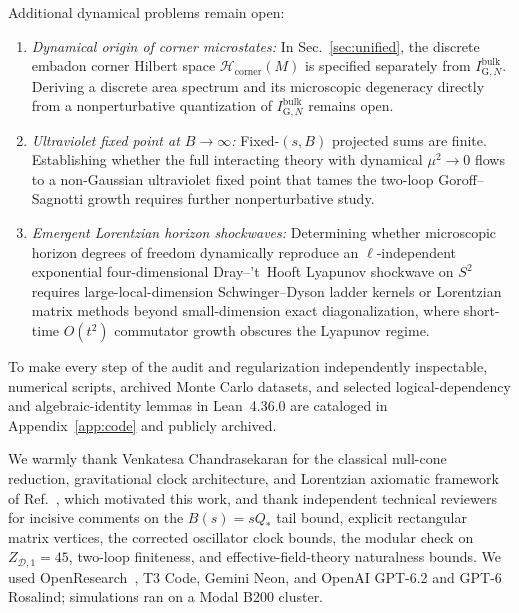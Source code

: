 \documentclass[onecolumn,11pt,aps,prd,amsmath,amssymb,nofootinbib,floatfix]{revtex4-2}
\newcommand{\scrD}{\mathscr{D}}
\newcommand{\calH}{\mathcal{H}}
\begin{document}
Additional dynamical problems remain open:
\begin{enumerate}
\item \emph{Dynamical origin of corner microstates:} In Sec.~\ref{sec:unified}, the discrete embadon corner Hilbert space $\calH_{\mathrm{corner}}(M)$ is specified separately from $I_{\mathrm{G},N}^{\mathrm{bulk}}$. Deriving a discrete area spectrum and its microscopic degeneracy directly from a nonperturbative quantization of $I_{\mathrm{G},N}^{\mathrm{bulk}}$ remains open.
\item \emph{Ultraviolet fixed point at $B\to\infty$:} Fixed-$(s,B)$ projected sums are finite. Establishing whether the full interacting theory with dynamical $\mu^2\to 0$ flows to a non-Gaussian ultraviolet fixed point that tames the two-loop Goroff--Sagnotti growth requires further nonperturbative study.
\item \emph{Emergent Lorentzian horizon shockwaves:} Determining whether microscopic horizon degrees of freedom dynamically reproduce an $\ell$-independent exponential four-dimensional Dray--'t~Hooft Lyapunov shockwave on $S^2$ requires large-local-dimension Schwinger--Dyson ladder kernels or Lorentzian matrix methods beyond small-dimension exact diagonalization, where short-time $O(t^2)$ commutator growth obscures the Lyapunov regime.
\end{enumerate}

To make every step of the audit and regularization independently inspectable, numerical scripts, archived Monte Carlo datasets, and selected logical-dependency and algebraic-identity lemmas in Lean~4.36.0 are cataloged in Appendix~\ref{app:code} and publicly archived.

\begin{acknowledgments}
We warmly thank Venkatesa Chandrasekaran for the classical null-cone reduction, gravitational clock architecture, and Lorentzian axiomatic framework of Ref.~\cite{Chandrasekaran2026}, which motivated this work, and thank independent technical reviewers for incisive comments on the $B(s)=s Q_*$ tail bound, explicit rectangular matrix vertices, the corrected oscillator clock bounds, the modular check on $Z_{\scrD,1}=45$, two-loop finiteness, and effective-field-theory naturalness bounds. We used OpenResearch~\cite{openresearch}, T3 Code, Gemini Neon, and OpenAI GPT-6.2 and GPT-6 Rosalind; simulations ran on a Modal B200 cluster.
\end{acknowledgments}

\appendix
\end{document}

